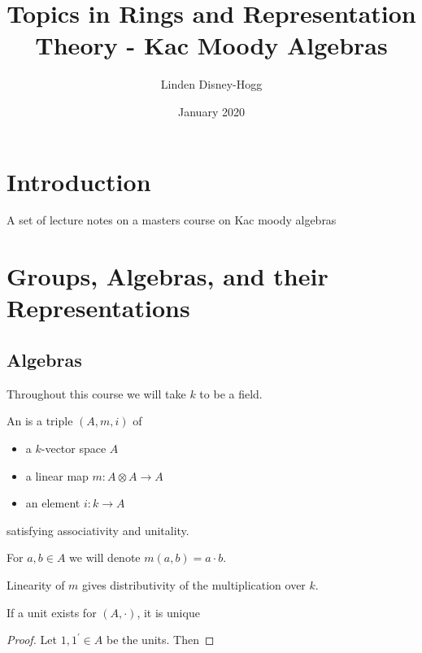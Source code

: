 \documentclass{article}
\title{Topics in Rings and Representation Theory - Kac Moody Algebras}
\author{Linden Disney-Hogg}
\date{January 2020}
\begin{document}
\maketitle
\tableofcontents

\section{Introduction}
A set of lecture notes on a masters course on Kac moody algebras 

\section{Groups, Algebras, and their Representations}


\subsection{Algebras}
Throughout this course we will take $k$ to be a field. 

\begin{definition}
An  is a triple $(A,m,i)$ of
\begin{itemize}
    \item a $k$-vector space $A$
    \item a linear map $m: A \otimes A \to A$
    \item an element $i : k \to A$
\end{itemize}
satisfying associativity and unitality. 
\end{definition}

\begin{notation}
For $a,b \in A$ we will denote $m(a,b) = a \cdot b$. 
\end{notation}

\begin{remark}
Linearity of $m$ gives distributivity of the multiplication over $k$.
\end{remark}

\begin{prop}
If a unit exists for $(A,\cdot)$, it is unique
\end{prop}
\begin{proof}
Let $1,1^\prime\in A$ be the units. Then 
\end{proof}
\end{document}
